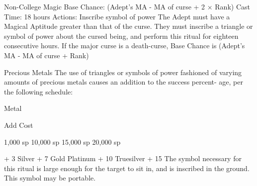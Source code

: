 \begin{Chapter}{Non-College Magic}
Base  Chance:  (Adept’s  MA  -  MA  of  curse  +  2  × 
Rank)%
Cast Time: 18 hours 
Actions: Inscribe symbol of power 
The  Adept  must  have  a  Magical  Aptitude  greater 
than that of the curse. They must inscribe a triangle 
or  symbol  of  power  about  the  cursed  being,  and 
perform  this  ritual  for  eighteen  consecutive  hours. 
If the major curse is a death-curse, Base Chance is 
(Adept’s MA - MA of curse + Rank)%

Precious  Metals  The  use  of  triangles  or  symbols 
of power fashioned of varying amounts of precious 
metals  causes  an  addition  to  the  success  percent-
age, per the following schedule: 

Metal 

Add  Cost 

1,000 sp 
10,000 sp 
15,000 sp 
20,000 sp 

+ 3 
Silver 
+ 7 
Gold  
Platinum 
+ 10 
Truesilver  + 15 
The  symbol  necessary  for  this  ritual  is  large 
enough  for  the  target  to  sit  in,  and  is  inscribed  in 
the ground. This symbol may be portable. 

\end{Chapter}
